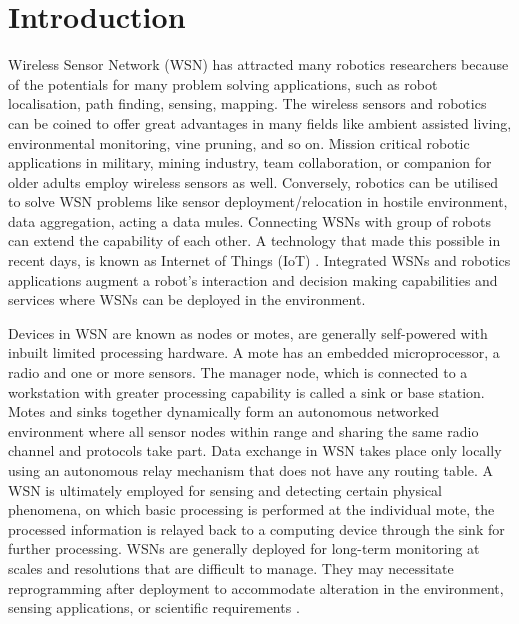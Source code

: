 \documentclass[conference,final]{IEEEtran}
\begin{document}
\section{Introduction}
\label{sec:intro}

Wireless Sensor Network (WSN) has attracted many robotics researchers because of the potentials for many problem solving applications, such as robot localisation, path finding, sensing, mapping. 
The wireless sensors and robotics can be coined to offer great advantages in many fields like ambient assisted living, environmental monitoring, vine pruning, and so on.
Mission critical robotic applications in military, mining industry, team collaboration, or companion for older adults employ wireless sensors as well.
Conversely, robotics can be utilised to solve WSN problems like sensor deployment/relocation in hostile environment, data aggregation, acting a data mules.
Connecting WSNs with group of robots can extend the capability of each other.
A technology that made this possible in recent days, is known as Internet of Things (IoT) .
Integrated WSNs and robotics applications augment a robot's interaction and decision making capabilities and services where WSNs can be deployed in the environment.

Devices in WSN are known as nodes or motes, are generally self-powered with inbuilt limited processing hardware.
A mote has an embedded microprocessor, a radio and one or more sensors.
The manager node, which is connected to a workstation with greater processing capability is called a sink or base station. 
Motes and sinks together dynamically form an autonomous networked environment where all sensor nodes within range and sharing the same radio channel and protocols take part.
Data exchange in WSN takes place only locally using an autonomous relay mechanism that does not have any routing table. 
A WSN is ultimately employed for sensing and detecting certain physical phenomena, on which basic processing is performed at the individual mote, the processed information is relayed back to a computing device  through the sink for further processing.
WSNs are generally deployed for long-term monitoring at scales and resolutions that are difficult to manage. 
They may necessitate reprogramming after deployment to accommodate alteration in the environment, sensing applications, or scientific requirements \cite{ISI:000253439700120}.
\end{document}
